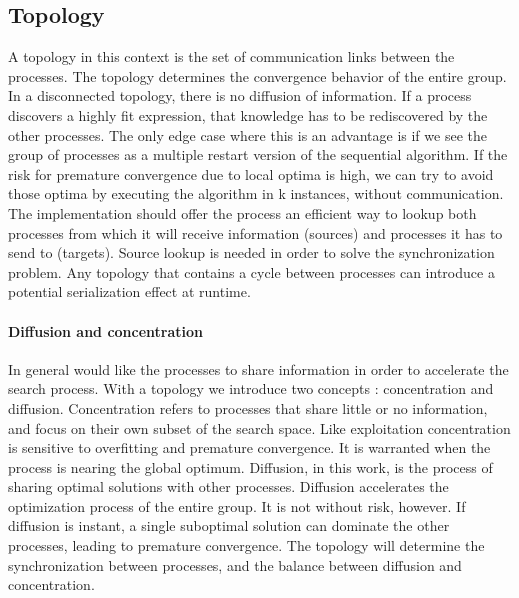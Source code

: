 \subsection{Topology}
A topology in this context is the set of communication links between the processes. The topology determines the convergence behavior of the entire group. In a disconnected topology, there is no diffusion of information. If a process discovers a highly fit expression, that knowledge has to be rediscovered by the other processes. The only edge case where this is an advantage is if we see the group of processes as a multiple restart version of the sequential algorithm. If the risk for premature convergence due to local optima is high, we can try to avoid those optima by executing the algorithm in k instances, without communication. 
The implementation should offer the process an efficient way to lookup both processes from which it will receive information (sources) and processes it has to send to (targets). Source lookup is needed in order to solve the synchronization problem. Any topology that contains a cycle between processes can introduce a potential serialization effect at runtime.
\paragraph{Diffusion and concentration}
In general would like the processes to share information in order to accelerate the search process. With a topology we introduce two concepts : concentration and diffusion. Concentration refers to processes that share little or no information, and focus on their own subset of the search space. Like exploitation concentration is sensitive to overfitting and premature convergence. It is warranted when the process is nearing the global optimum. Diffusion, in this work, is the process of sharing optimal solutions with other processes. Diffusion accelerates the optimization process of the entire group. It is not without risk, however. If diffusion is instant, a single suboptimal solution can dominate the other processes, leading to premature convergence. 
The topology will determine the synchronization between processes, and the balance between diffusion and concentration.
